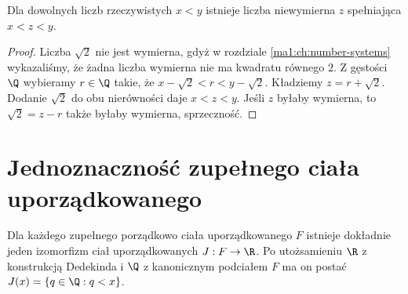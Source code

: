 \begin{wniosek}
\label{ma1:cor:irrational-density}
Dla dowolnych liczb rzeczywistych $x<y$ istnieje liczba niewymierna $z$ spełniająca $x<z<y$.
\end{wniosek}
\begin{proof}
Liczba $\sqrt2$ nie jest wymierna, gdyż w rozdziale \ref{ma1:ch:number-systems} wykazaliśmy, że żadna liczba wymierna nie ma kwadratu równego $2$. Z gęstości $\Q$ wybieramy $r\in\Q$ takie, że $x-\sqrt2<r<y-\sqrt2$. Kładziemy $z=r+\sqrt2$. Dodanie $\sqrt2$ do obu nierówności daje $x<z<y$. Jeśli $z$ byłaby wymierna, to $\sqrt2=z-r$ także byłaby wymierna, sprzeczność.
\end{proof}

\section{Jednoznaczność zupełnego ciała uporządkowanego}
\begin{twierdzenie}
\label{ma1:thm:real-uniqueness}
Dla każdego zupełnego porządkowo ciała uporządkowanego $F$ istnieje dokładnie jeden izomorfizm ciał uporządkowanych $J:F\to\R$. Po utożsamieniu $\R$ z konstrukcją Dedekinda i $\Q$ z kanonicznym podciałem $F$ ma on postać $J(x)=\{q\in\Q:q<x\}$.
\end{twierdzenie}
